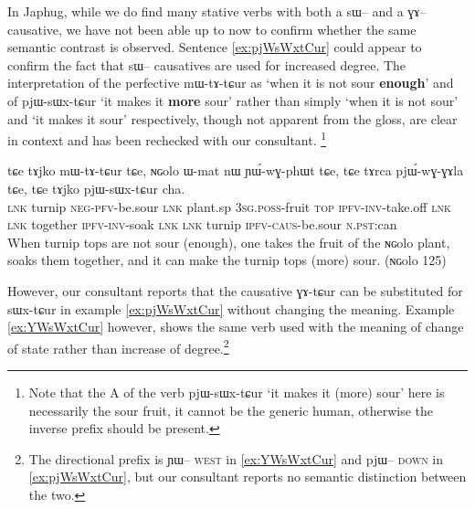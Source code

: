 \documentclass[oldfontcommands,oneside,a4paper,11pt]{article}
\newcommand{\ipa}[1]{{\phon \mbox{#1}}} %
\begin{document}
In Japhug, while we do find many stative verbs with both a \ipa{sɯ--} and a \ipa{ɣɤ--} causative, we have not been able up to now to confirm whether the same semantic contrast is observed. Sentence \ref{ex:pjWsWxtCur} could appear to confirm  the fact that \ipa{sɯ--} causatives are used for increased degree. The interpretation of the perfective	\ipa{mɯ-tɤ-tɕur}  as `when it is not sour \textbf{enough}' and of  \ipa{pjɯ-sɯx-tɕur} `it makes it \textbf{more} sour' rather than simply `when it is not sour' and  `it makes it sour' respectively, though not apparent from the gloss, are clear in context and has been rechecked with our consultant.  \footnote{Note that the A of the verb \ipa{pjɯ-sɯx-tɕur} `it makes it (more) sour' here is necessarily the sour fruit, it cannot be the generic human, otherwise the inverse prefix should be present. }
\begin{exe}
\ex \label{ex:pjWsWxtCur}
\gll 
\ipa{tɕe}  	\ipa{tɤjko}  	\ipa{mɯ-tɤ-tɕur}  	\ipa{tɕe,}  	\ipa{ɴɢolo}  	\ipa{ɯ-mat}  	\ipa{nɯ}  	\ipa{ɲɯ́-wɣ-phɯt}  	\ipa{tɕe,}  	\ipa{tɕe}  	\ipa{tɤrca}  	\ipa{pjɯ́-wɣ-ɣɤla}  	\ipa{tɕe,}  	\ipa{tɕe}  	\ipa{tɤjko}  	\ipa{pjɯ-sɯx-tɕur}  	\ipa{cha.}  \\
\textsc{lnk} turnip \textsc{neg-pfv}-be.sour \textsc{lnk} plant.sp \textsc{3sg.poss}-fruit \textsc{top} \textsc{ipfv-inv}-take.off \textsc{lnk} \textsc{lnk} together \textsc{ipfv-inv}-soak  \textsc{lnk} \textsc{lnk} turnip \textsc{ipfv-caus}-be.sour \textsc{n.pst}:can \\
\glt When turnip tops are not sour (enough), one takes the fruit of the \ipa{ɴɢolo} plant, soaks them together, and it can make  the turnip tops (more) sour. (ɴɢolo 125)
\end{exe}

However, our consultant reports that the causative \ipa{ɣɤ-tɕur} can be substituted for 	\ipa{sɯx-tɕur}  in example \ref{ex:pjWsWxtCur} without changing the meaning. Example \ref{ex:YWsWxtCur} however, shows the same verb used with the meaning of change of state rather than increase of degree.\footnote{The directional prefix is \ipa{ɲɯ--} \textsc{west} in \ref{ex:YWsWxtCur} and \ipa{pjɯ--} \textsc{down} in \ref{ex:pjWsWxtCur}, but our consultant reports no semantic distinction between the two.}
\end{document}
